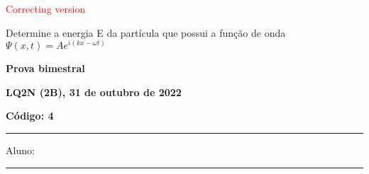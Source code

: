 \documentclass[12pt, addpoints]{exam}
\begin{document}
        \begin{center}
\textcolor{red}{\emph\Large Correcting version}\end{center}
\begin{questions}
\begin{multicols*}{2}
\question[20] Determine a energia E da partícula que possui a função de onda $\Psi(x,t)=Ae^{i(kx-\omega t)}$

\begin{oneparchoices}
\end{oneparchoices}
\end{multicols*}
\end{questions}
\newpage
        \begin{minipage}[b]{0.75\linewidth}
            \begin{flushleft}
                {\bf \large Prova bimestral}
            \end{flushleft}
            \begin{flushleft}
                {\bf \large LQ2N (2B), 31 de outubro de 2022}
            \end{flushleft}
        \end{minipage}
        \begin{minipage}[b]{0.20\linewidth}
            \begin{flushright}
                {\bf \large Código: 4}
            \end{flushright}
        \end{minipage}
        \vspace{0.5cm} \hrule \vspace{0.5cm}
        \begin{minipage}{0.75\linewidth}
            Aluno:
        \end{minipage}
        \vspace{0.5cm} \hrule \vspace{0.5cm}
\end{document}
